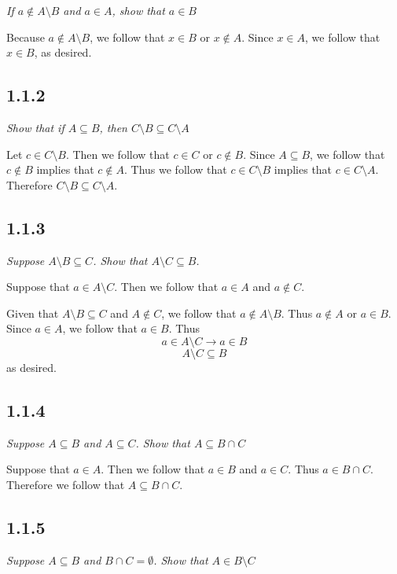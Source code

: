\documentclass[11pt,oneside,titlepage]{book}
\begin{document}
\textit{If $a \notin A \setminus B$ and $a \in A$, show that $a \in B$}

Because $a \notin A \setminus B$, we follow that $x \in B$ or $x \notin A$. Since $x \in A$, we
follow that $x \in B$, as desired.

\subsection*{1.1.2}

\textit{Show that if $A \subseteq B$, then $C \setminus B \subseteq C \setminus A$}

Let $c \in C \setminus B$. Then we follow that $c \in C$ or $c \notin B$. Since $A \subseteq B$,
we follow that $c \notin B$ implies that $c \notin A$. Thus we follow that
$c \in C \setminus B$ implies that $c \in C \setminus A$. Therefore $C \setminus B \subseteq
C \setminus A$.

\subsection*{1.1.3}

\textit{Suppose $A \setminus B \subseteq C$. Show that $A \setminus C \subseteq B$.}

Suppose that $a \in A \setminus C$. Then we follow that $a \in A$ and $a \notin C$.

Given that $A \setminus B \subseteq C$ and $A \notin C$, we follow that $a \notin A \setminus B$.
Thus $a \notin A$ or $a \in B$. Since $a \in A$, we follow that $a \in B$. Thus
$$a \in A \setminus C \to a \in B$$
$$A \setminus C \subseteq  B$$
as desired.

\subsection*{1.1.4}

\textit{Suppose $A \subseteq B$ and $A \subseteq C$. Show that $A \subseteq B \cap C$}

Suppose that $a \in A$. Then we follow that $a \in B$ and $a \in C$. Thus $a \in B \cap C$.
Therefore we follow that $A \subseteq B \cap C$.

\subsection*{1.1.5}

\textit{Suppose $A \subseteq B$ and $B \cap C = \emptyset$. Show that $A \in B \setminus C$}
\end{document}
